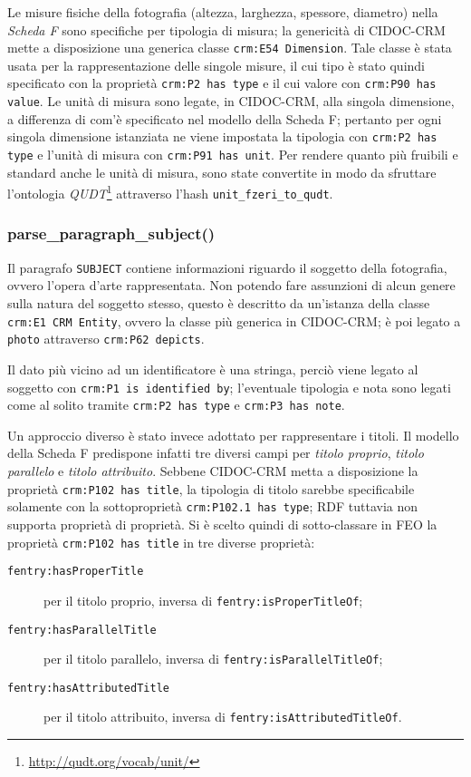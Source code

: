 Le misure fisiche della fotografia (altezza, larghezza, spessore, diametro) nella \emph{Scheda F} sono specifiche per tipologia di misura; la genericità di CIDOC-CRM mette a disposizione una generica classe \texttt{crm:E54 Dimension}. Tale classe è stata usata per la rappresentazione delle singole misure, il cui tipo è stato quindi specificato con la proprietà \texttt{crm:P2 has type} e il cui valore con \texttt{crm:P90 has value}. Le unità di misura sono legate, in CIDOC-CRM, alla singola dimensione, a differenza di com'è specificato nel modello della Scheda F; pertanto per ogni singola dimensione istanziata ne viene impostata la tipologia con \texttt{crm:P2 has type} e l'unità di misura con \texttt{crm:P91 has unit}. Per rendere quanto più fruibili e standard anche le unità di misura, sono state convertite in modo da sfruttare l'ontologia \emph{QUDT}\footnote{\url{http://qudt.org/vocab/unit/}} attraverso l'hash \texttt{unit\_fzeri\_to\_qudt}.

\subsubsection{parse\_paragraph\_subject()}
Il paragrafo \texttt{SUBJECT} contiene informazioni riguardo il soggetto della fotografia, ovvero l'opera d'arte rappresentata. Non potendo fare assunzioni di alcun genere sulla natura del soggetto stesso, questo è descritto da un'istanza della classe \texttt{crm:E1 CRM Entity}, ovvero la classe più generica in CIDOC-CRM; è poi legato a \texttt{photo} attraverso \texttt{crm:P62 depicts}.

Il dato più vicino ad un identificatore è una stringa, perciò viene legato al soggetto con \texttt{crm:P1 is identified by}; l'eventuale tipologia e nota sono legati come al solito tramite \texttt{crm:P2 has type} e \texttt{crm:P3 has note}.

Un approccio diverso è stato invece adottato per rappresentare i titoli. Il modello della Scheda F predispone infatti tre diversi campi per \emph{titolo proprio}, \emph{titolo parallelo} e \emph{titolo attribuito}. Sebbene CIDOC-CRM metta a disposizione la proprietà \texttt{crm:P102 has title}, la tipologia di titolo sarebbe specificabile solamente con la sottoproprietà \texttt{crm:P102.1 has type}; RDF tuttavia non supporta proprietà di proprietà. Si è scelto quindi di sotto-classare in FEO la proprietà \texttt{crm:P102 has title} in tre diverse proprietà:
\begin{description}
\item[\texttt{fentry:hasProperTitle}] per il titolo proprio, inversa di \texttt{fentry:isProperTitleOf};
\item[\texttt{fentry:hasParallelTitle}] per il titolo parallelo, inversa di \texttt{fentry:isParallelTitleOf};
\item[\texttt{fentry:hasAttributedTitle}] per il titolo attribuito, inversa di \texttt{fentry:isAttributedTitleOf}.
\end{description}

